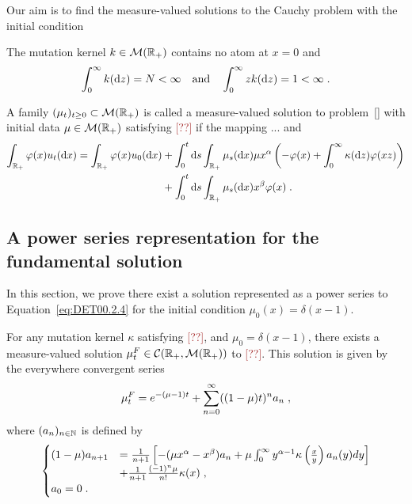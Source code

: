 \documentclass[11pt]{amsart}
\newcommand{\R}{\RR}
\newcommand{\f}{\frac}
\newcommand{\dd}{\mathrm{d}}
\newcommand{\ndr}[1]{\textcolor{brown}{[#1]}}
\begin{document}
Our aim is to find the measure-valued solutions to the Cauchy problem with the initial condition

\begin{hypothesis}
The mutation kernel $k \in \mathcal{M}(\mathbb{R}_+)$ contains no atom at $x = 0$ and 
$$ \int_0^\infty k(\dd z) = N < \infty \mtext{and} \int_0^\infty z k(\dd z) = 1 < \infty \eqfinp$$ 
\end{hypothesis}

\begin{definition}\label{def:DETinv2.1}
    A family $(\mu_t)_{t \geq 0} \subset \mathcal{M}(\mathbb{R}_+)$ is called a measure-valued solution to problem~\eqref{} with initial data $\mu \in \mathcal{M}(\mathbb{R}_+)$ satisfying \ndr{??} if the mapping ... 
    and 
    \begin{align*}
        \int_{\RR_+} \varphi(x) u_t(\dd x)
        = 
        \int_{\RR_+} \varphi(x) u_0(\dd x) 
        &+ \int_0^t\dd s \int_{\RR_+} \mu_s(\dd x)\mu x^\alpha \left( - \varphi(x) + \int_0^\infty \kappa(\dd z)\varphi(xz)\right) \\
        &+ \int_0^t\dd s \int_{\RR_+} \mu_s(\dd x) x^\beta \varphi(x)
        \eqfinp
    \end{align*}
\end{definition}

\subsection{A power series representation for the fundamental solution}
In this section, we prove there exist a solution represented as a power series to Equation~\eqref{eq:DET00.2.4} for the initial condition $\mu_0(x) = \delta(x-1)$.\\

\begin{theorem}
    For any mutation kernel $\kappa$ satisfying \ndr{??}, and $\mu_0 = \delta(x-1)$, there exists a measure-valued solution $\mu_t^F \in \Ccal(\RR_+, \Mcal(\R_+))$ to \ndr{??}. This solution is given by the everywhere convergent series
    \begin{align}
        \mu_t^F 
        = 
        e^{-(\mu-1)t} + \sum_{n = 0}^\infty ((1-\mu) t)^n a_n
        \; ,
    \end{align}
where $(a_n)_{n \in \mathbb{N}}$ is defined by 
\begin{align*}
    \begin{cases}
    (1-\mu) a_{n+1} 
    &= \frac{1}{n+1}\left[ -(\mu x^{\alpha} - x^\beta) a_n + \mu \int_0^\infty y^{\alpha-1} \kappa \left( \f{x}{y}\right) a_n(y) dy \right] \\
    &+ \frac{1}{n+1} \frac{(-1)^n \mu }{n!}\kappa(x) 
    \eqfinv \\
    a_0 = 0 \eqfinp
    \end{cases}
\end{align*}
\end{theorem}
\end{document}
